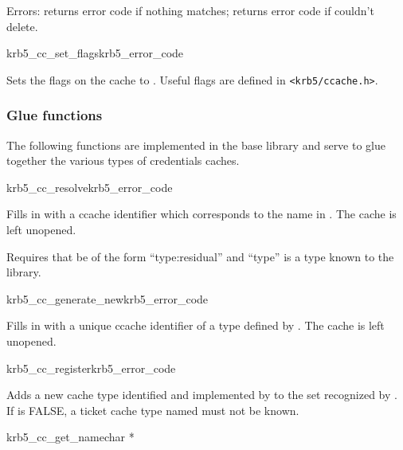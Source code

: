 Errors: returns error code if nothing matches; returns error code if
couldn't delete.

\begin{funcdecl}{krb5_cc_set_flags}{krb5_error_code}{\funcin}
\end{funcdecl}

Sets the flags on the cache  to .  Useful
flags are defined in {\tt <krb5/ccache.h>}.


\subsubsection{Glue functions}
The following functions are implemented in the base library and serve to
glue together the various types of credentials caches.


\begin{funcdecl}{krb5_cc_resolve}{krb5_error_code}{\funcin}
\funcout
{}
\end{funcdecl}

Fills in  with a ccache identifier which corresponds to
the name in .  The cache is left unopened.

Requires that  be of the form ``type:residual'' and
``type'' is a type known to the library.

\begin{funcdecl}{krb5_cc_generate_new}{krb5_error_code}{\funcin}
\funcout
{}
\end{funcdecl}


Fills in  with a unique ccache identifier of a type defined by
.  The cache is left unopened.

\begin{funcdecl}{krb5_cc_register}{krb5_error_code}{\funcin}
\end{funcdecl}

Adds a new cache type identified and implemented by  to
the set recognized by .
If  is FALSE, a ticket cache type named
 must not be known.

\begin{funcdecl}{krb5_cc_get_name}{char *}{\funcin}
\end{funcdecl}

